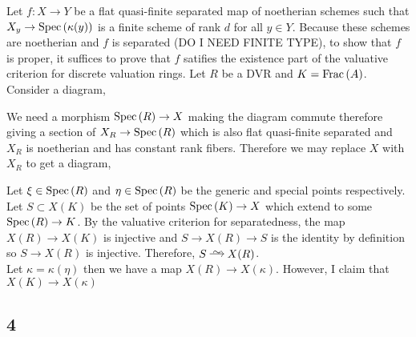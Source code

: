 \documentclass[12pt]{article}
\begin{document}
Let $f : X \to Y$ be a flat quasi-finite separated map of noetherian schemes such that $X_y \to \mathrm{Spec}\left( \kappa(y) \right)$ is a finite scheme of rank $d$ for all $y \in Y$. Because these schemes are noetherian and $f$ is separated (DO I NEED FINITE TYPE), to show that $f$ is proper, it suffices to prove that $f$ satifies the existence part of the valuative criterion for discrete valuation rings. Let $R$ be a DVR and $K = \mathrm{Frac}\left(A\right)$. Consider a diagram,
\begin{center}
\end{center}
We need a morphism $\mathrm{Spec}\left( R \right) \to X$ making the diagram commute therefore giving a section of $X_R \to \mathrm{Spec}\left( R \right)$ which is also flat quasi-finite separated and $X_R$ is noetherian and has constant rank fibers. Therefore we may replace $X$ with $X_R$ to get a diagram,
\begin{center}
\end{center}
Let $\xi \in \mathrm{Spec}\left( R \right)$ and $\eta \in \mathrm{Spec}\left( R \right)$ be the generic and special points respectively. Let $S \subset X(K)$ be the set of points $\mathrm{Spec}\left( K \right) \to X$ which extend to some $\mathrm{Spec}\left( R \right) \to K$. By the valuative criterion for separatedness, the map $X(R) \to X(K)$ is injective and $S \to X(R) \to S$ is the identity by definition so $S \to X(R)$ is injective. Therefore, $S \iso X(R)$. 
\bigskip\\
Let $\kappa = \kappa(\eta)$ then we have a map $X(R) \to X(\kappa)$. However, I claim that $X(K) \to X(\kappa)$ 

\subsection{4}
\end{document}
